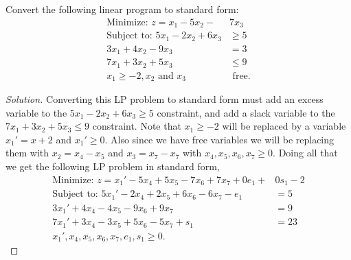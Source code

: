 \documentclass[12pt]{article}
\makeatletter
\theoremstyle{homework}
\newenvironment{exercise}[1]
{\def\@currentlabel{#1}\exercisecore}
{\endexercisecore}
\makeatother
\begin{document}
\begin{exercise}{2.2} Convert the following linear program to standard form:
  \begin{align*}
    \text{Minimize: } z = x_1 - 5x_2 - &7x_3\\
    \text{Subject to: } 5x_1 - 2x_2 + 6x_3 &\geq 5\\
    3x_1  + 4x_2 -9 x_3  &=  3\\
    7x_1  +3x_2 +5x_3  &\leq 9\\
    x_1 \geq -2, x_2 \text{ and } x_3 &\text{ free}.
  \end{align*}
  \begin{proof}[Solution] Converting this LP problem to standard form must add 
    an excess variable to the $5x_1 - 2x_2 + 6x_3 \geq 5$ constraint, and 
    add a slack variable to the $7x_1  +3x_2 +5x_3  \leq 9$ constraint. Note that $x_1 \geq -2$ 
    will be replaced by a variable $x_1' = x + 2$ and $x_1' \geq 0$. Also since we have free variables we will 
    be replacing them with $x_2 = x_4 - x_5$ and $x_3 = x_7 - x_7$ with $x_4, x_5, x_6, x_7 \geq 0$. 
    Doing all that we get the following LP problem in standard form,
    \begin{align*}
      \text{Minimize: } z = x_1' - 5x_4 + 5x_5 - 7x_6 + 7x_7 + 0e_1 + &0s_1 - 2\\
      \text{Subject to: } 5x_1' - 2x_4 + 2x_5 + 6x_6 - 6x_7 - e_1 &= 5\\
      3x_1'  + 4x_4 - 4x_5 -9x_6 + 9x_7  &=  9\\
      7x_1'  +3x_4 - 3x_5 +5x_6 - 5x_7 + s_1  &= 23\\
      x_1', x_4, x_5, x_6, x_7, e_1, s_1 \geq 0.
    \end{align*}
    
 \end{proof}
\end{exercise}
\vspace{.5in}
\end{document}
